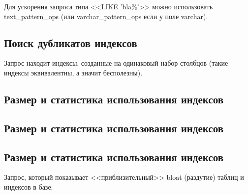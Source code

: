Для ускорения запроса типа <<LIKE 'bla\%'>> можно использовать text\_pattern\_ops
(или varchar\_pattern\_ops если у поле varchar).



\subsection{Поиск дубликатов индексов}
Запрос находит индексы, созданные на одинаковый набор столбцов (такие индексы эквивалентны, а значит бесполезны).



\subsection{Размер и статистика использования индексов}



\subsection{Размер и статистика использования индексов}



\subsection{Размер и статистика использования индексов}

Запрос, который показывает <<приблизительный>> bloat (раздутие) таблиц и индексов в базе:


